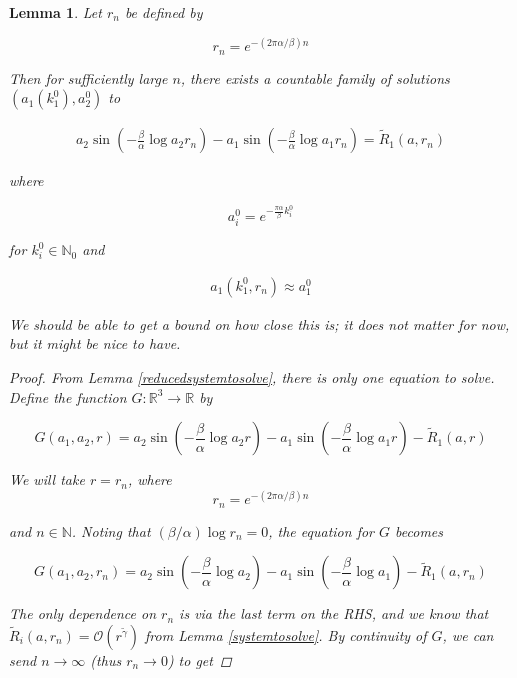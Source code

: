 \documentclass[12pt]{article}
\def\R{{\mathbb R}}
\def\N{{\mathbb N}}
\newtheorem{lemma}{Lemma}
\begin{document}
\begin{lemma}

Let $r_n$ be defined by

\begin{equation}
r_n =  e^{-(2 \pi \alpha / \beta) n}
\end{equation}

Then for sufficiently large $n$, there exists a countable family of solutions $(a_1(k_1^0), a_2^0)$ to 

\begin{align*}
a_2 \sin \left( - \frac{\beta}{\alpha} \log a_2 r_n \right) - a_1 \sin \left( - \frac{\beta}{\alpha} \log a_1 r_n \right) = \tilde{R}_1(a, r_n)
\end{align*}

where

\begin{equation}
a_i^0 = e^{-\frac{\pi \alpha}{\beta} k_i^0 }
\end{equation}

for $k_i^0 \in \N_0$ and 

\begin{align*}
a_1(k_1^0, r_n) \approx a_1^0
\end{align*}

We should be able to get a bound on how close this is; it does not matter for now, but it might be nice to have.

\begin{proof}

From Lemma \ref{reducedsystemtosolve}, there is only one equation to solve.
Define the function $G: \R^3 \rightarrow \R$ by

\begin{equation}\label{arequation}
G(a_1, a_2, r) = a_2 \sin \left(-\frac{\beta}{\alpha} \log a_2 r \right) - a_1 \sin \left( - \frac{\beta}{\alpha} \log a_1 r \right) - \tilde{R}_1(a, r)
\end{equation}

We will take $r = r_n$, where
\[
r_n =  e^{-(2 \pi \alpha / \beta) n}
\]

and $n \in \N$. Noting that $(\beta / \alpha) \log r_n = 0$, the equation for $G$ becomes

\begin{equation}\label{rinremainder}
G(a_1, a_2, r_n) = a_2 \sin \left( - \frac{\beta}{\alpha} \log a_2 \right) - a_1 \sin \left( - \frac{\beta}{\alpha} \log a_1 \right) - \tilde{R}_1(a, r_n)
\end{equation}

The only dependence on $r_n$ is via the last term on the RHS, and we know that $\tilde{R}_i(a, r_n) = \mathcal{O}(r^{\tilde{\gamma}})$ from Lemma \ref{systemtosolve}. By continuity of $G$, we can send $n \rightarrow \infty$ (thus $r_n \rightarrow 0$) to get


\end{proof}
\end{lemma}
\end{document}
